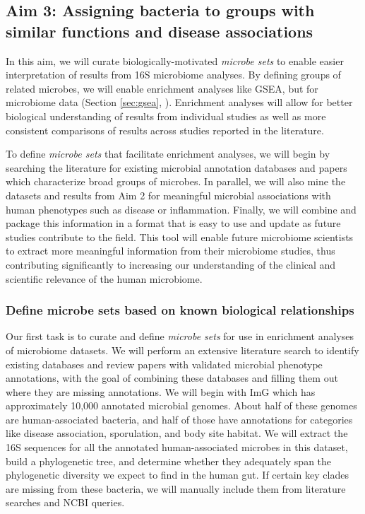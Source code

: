 \documentclass[12pt]{article}
\begin{document}
\subsection{Aim 3: Assigning bacteria to groups with similar functions and disease associations}

In this aim, we will curate biologically-motivated \textit{microbe 
sets} to enable easier interpretation of results from 16S microbiome 
analyses. By defining groups of related microbes, we 
will enable enrichment analyses like GSEA, but for microbiome data (Section \ref{sec:gsea}, 
\cite{subramanian-gsea-2005}). Enrichment analyses will allow for better 
biological understanding of results from individual studies as well as 
more consistent comparisons of results across studies reported in 
the literature.

To define \textit{microbe sets} that facilitate enrichment analyses, we will
begin by searching the literature for existing microbial annotation
databases and papers which characterize broad groups of microbes.
In parallel, we will also mine the datasets and results from Aim 2
for meaningful microbial associations with human phenotypes such as
disease or inflammation. Finally, we will combine and package this information
in a format that is easy to use and update as future studies contribute
to the field. This tool will enable future microbiome scientists to extract more
meaningful information from their microbiome studies, thus
contributing significantly to increasing our understanding of the
clinical and scientific relevance of the human microbiome.


\subsubsection{Define microbe sets based on known biological relationships}\label{sec:set_curation}

Our first task is to curate and define \textit{microbe sets} for use in enrichment analyses of 
microbiome datasets. We will perform an extensive literature search
to identify existing databases and review papers with validated microbial phenotype annotations, with the goal of
combining these databases and filling them out where they are missing annotations.
We will begin with ImG which has approximately 10,000 annotated microbial genomes. 
About half of these genomes are human-associated bacteria, 
and half of those have annotations for categories like disease 
association, sporulation, and body site habitat. 
We will extract the 16S sequences for all the annotated human-associated 
microbes in this dataset, build a phylogenetic tree, and determine whether 
they adequately span the phylogenetic diversity we expect to 
find in the human gut. If certain key clades are missing from these 
bacteria, we will manually include them from literature searches and 
NCBI queries.
\end{document}
